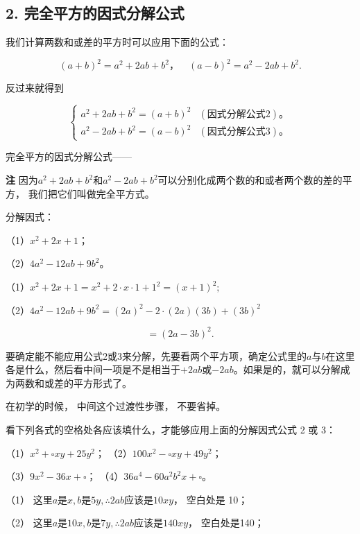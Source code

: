 \subsection{2. 完全平方的因式分解公式}

我们计算两数和或差的平方时可以应用下面的公式：

\[
(a + b) ^{2} = a ^{2} + 2 a b + b ^{2}\text{，} \quad (a - b) ^{2} = a ^{2} - 2 a b + b ^{2}.
\]

反过来就得到

\[
\left\{ \begin{array}{ll} a ^{2} + 2 a b + b ^{2} = (a + b) ^{2} & (\text{因式分解公式} 2)\text{。} \\ a ^{2} - 2 a b + b ^{2} = (a - b) ^{2} & (\text{因式分解公式} 3)\text{。} \end{array} \right.
\]

完全平方的因式分解公式------

\textbf{注}
因为\(a^2 + 2ab + b^2\)和\(a^2 - 2ab + b^2\)可以分别化成两个数的和或者两个数的差的平方，
我们把它们叫做完全平方式。

 分解因式：

（1）\(x^{2} + 2x + 1\)；

（2）\(4a^{2} - 12ab + 9b^{2}\)。

（1）\(x^{2} + 2x + 1 = x^{2} + 2\cdot x\cdot 1 + 1^{2} = (x + 1)^{2};\)

（2）\(4a^{2} - 12ab + 9b^{2} = (2a)^{2} - 2 \cdot (2a)(3b) + (3b)^{2}\)

\[
= (2 a - 3 b) ^{2}.
\]

要确定能不能应用公式2或3来分解，先要看两个平方项，确定公式里的\(a\)与\(b\)在这里各是什么，然后看中间一项是不是相当于\(+2ab\)或\(-2ab\)。如果是的，就可以分解成为两数和或差的平方形式了。

在初学的时候， 中间这个过渡性步骤， 不要省掉。

看下列各式的空格处各应该填什么，才能够应用上面的分解因式公式 2 或 3：

（1）\(x^{2} + \square xy + 25y^{2}\)；
（2）\(100x^{2} - \square xy + 49y^{2}\)；

（3）\(9x^{2} - 36x + \square\)；
（4）\(36a^{4} - 60a^{2}b^{2}x + \square\)。

 （1）
这里\(a\)是\(x, b\)是\(5y, \therefore 2ab\)应该是\(10xy\)， 空白处是
10；

（2） 这里\(a\)是\(10x, b\)是\(7y, \therefore 2ab\)应该是\(140xy\)，
空白处是140；

